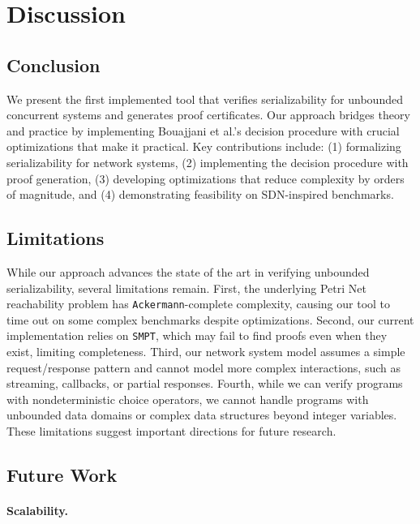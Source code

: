\section{Discussion}
\label{sec:discussion}

\subsection{Conclusion}

We present the first implemented tool that verifies serializability for unbounded concurrent systems and generates proof certificates.
Our approach bridges theory and practice by implementing Bouajjani et al.'s decision procedure with crucial optimizations that make it practical.
%
Key contributions include: (1) formalizing serializability for network systems, (2) implementing the decision procedure with proof generation, (3) developing optimizations that reduce complexity by orders of magnitude, and (4) demonstrating feasibility on SDN-inspired benchmarks.

%

\subsection{Limitations}

While our approach advances the state of the art in verifying unbounded serializability, several limitations remain.
First, the underlying Petri Net reachability problem has \texttt{Ackermann}-complete complexity, causing our tool to time out on some complex benchmarks despite optimizations.
Second, our current implementation relies on \texttt{SMPT}, which may fail to find proofs even when they exist, limiting completeness.
Third, our network system model assumes a simple request/response pattern and cannot model more complex interactions, such as streaming, callbacks, or partial responses.
Fourth, while we can verify programs with nondeterministic choice operators, we cannot handle programs with unbounded data domains or complex data structures beyond integer variables.
These limitations suggest important directions for future research.

\subsection{Future Work}

\paragraph{Scalability.}

